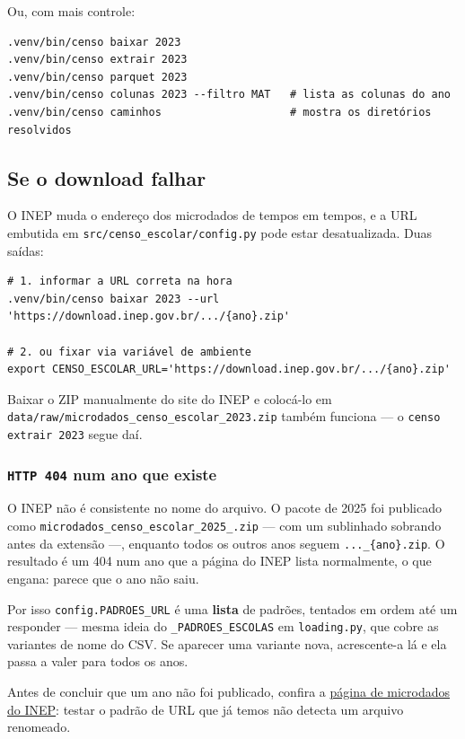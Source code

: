 \documentclass[11pt]{article}
\begin{document}
Ou, com mais controle:

\begin{verbatim}
.venv/bin/censo baixar 2023
.venv/bin/censo extrair 2023
.venv/bin/censo parquet 2023
.venv/bin/censo colunas 2023 --filtro MAT   # lista as colunas do ano
.venv/bin/censo caminhos                    # mostra os diretórios resolvidos
\end{verbatim}
\subsection*{Se o download falhar}
\label{sec:org4106759}
O INEP muda o endereço dos microdados de tempos em tempos, e a URL embutida em
\texttt{src/censo\_escolar/config.py} pode estar desatualizada. Duas saídas:

\begin{verbatim}
# 1. informar a URL correta na hora
.venv/bin/censo baixar 2023 --url 'https://download.inep.gov.br/.../{ano}.zip'

# 2. ou fixar via variável de ambiente
export CENSO_ESCOLAR_URL='https://download.inep.gov.br/.../{ano}.zip'
\end{verbatim}

Baixar o ZIP manualmente do site do INEP e colocá-lo em
\texttt{data/raw/microdados\_censo\_escolar\_2023.zip} também funciona — o
\texttt{censo extrair 2023} segue daí.
\subsubsection*{\texttt{HTTP 404} num ano que existe}
\label{sec:org13f4a98}

O INEP não é consistente no nome do arquivo. O pacote de 2025 foi publicado
como \texttt{microdados\_censo\_escolar\_2025\_.zip} — com um sublinhado sobrando antes da
extensão —, enquanto todos os outros anos seguem \texttt{...\_\{ano\}.zip}. O resultado é
um 404 num ano que a página do INEP lista normalmente, o que engana: parece que
o ano não saiu.

Por isso \texttt{config.PADROES\_URL} é uma \textbf{lista} de padrões, tentados em ordem até um
responder — mesma ideia do \texttt{\_PADROES\_ESCOLAS} em \texttt{loading.py}, que cobre as
variantes de nome do CSV. Se aparecer uma variante nova, acrescente-a lá e ela
passa a valer para todos os anos.

Antes de concluir que um ano não foi publicado, confira a
\href{https://www.gov.br/inep/pt-br/acesso-a-informacao/dados-abertos/microdados/censo-escolar}{página de microdados do INEP}: testar o
padrão de URL que já temos não detecta um arquivo renomeado.
\end{document}
